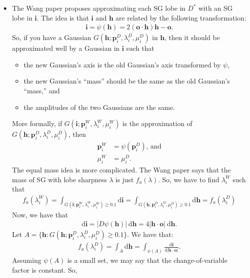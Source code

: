 \documentclass[10pt]{article}
\newcommand{\dee}{\mathrm{d}}
\newcommand{\ve}[1]{\mathbf{#1}}
\begin{document}
\begin{itemize}
    \item The Wang paper proposes approximating each SG lobe in $D^*$ with an SG lobe in $\ve{i}$.  The idea is that $\ve{i}$ and $\ve{h}$ are related by the following transformation:
    \begin{align*}
      \ve{i} = \psi(\ve{h}) = 2(\ve{o} \cdot \ve{h}) \ve{h} - \ve{o}.
    \end{align*}
    So, if you have a Gaussian $G(\ve{h}; \ve{p}_i^D, \lambda_i^D, \mu_i^D)$ in $\ve{h}$, then it should be approximated well by a Gaussian in $\ve{i}$ such that
    \begin{itemize}
      \item the new Gaussian's axis is the old Gaussian's axis transformed by $\psi$,
      \item the new Gaussian's ``mass'' should be the same as the old Gaussian's ``mass,'' and
      \item the amplitudes of the two Gaussians are the same.
    \end{itemize}
    More formally, if $G(\ve{i}; \ve{p}_i^W, \lambda_i^W, \mu_i^W)$ is the approximation of $G(\ve{h}; \ve{p}_i^D, \lambda_i^D, \mu_i^D)$, then
    \begin{align*}
      \ve{p}_i^W &= \psi(\ve{p}_i^D)\mbox{, and} \\
      \mu_i^W &= \mu_i^D.
    \end{align*}
    The equal mass idea is more complicated.  The Wang paper says that the mass of SG with lobe sharpness $\lambda$ is just $f_a(\lambda)$.  So, we have to find $\lambda_i^W$ such that
    \begin{align*}
      f_a(\lambda_i^W) = \int_{G(\ve{i}; \ve{p}_i^W, \lambda_i^W, \mu_i^W) \geq 0.1} \dee\ve{i} = \int_{G(\ve{h}; \ve{p}_i^D, \lambda_i^D, \mu_i^D) \geq 0.1} \dee\ve{h} = f_a(\lambda_i^D)
    \end{align*}
    Now, we have that
    \begin{align*}
      \dee \ve{i} = |D\psi(\ve{h})|\ \dee{\ve{h}} = 4 |\ve{h} \cdot \ve{o}|\ \dee\ve{h}.
    \end{align*}
    Let $A = \{ \ve{h} : G(\ve{h}; \ve{p}_i^D, \lambda_i^D, \mu_i^D) \geq 0.1 \}$.  We have that:
    \begin{align*}
      f_a(\lambda_i^D) 
      = \int_{A} \dee\ve{h}
      = \int_{\psi(A)} \frac{ \dee\ve{i} } { 4 |\ve{h} \cdot \ve{o}| }.
    \end{align*}
    Assuming $\psi(A)$ is a small set, we may say that the change-of-variable factor is constant.  So, 
    \begin{align*}

\end{align*}
\end{itemize}
\end{document}
